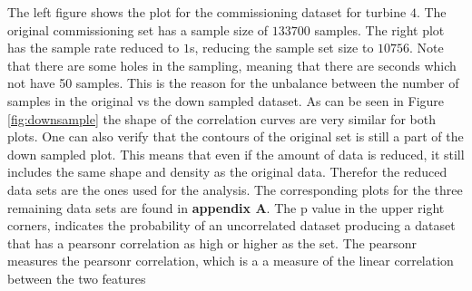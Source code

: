             The left figure shows the plot for the commissioning dataset for turbine $4$. The original commissioning set has a sample size of $133700$ samples. The right plot has the sample rate reduced to $1$s, reducing the sample set size to $10756$. Note that there are some holes in the sampling, meaning that there are seconds which not have 50 samples. This is the reason for the unbalance between the number of samples in the original vs the down sampled dataset. As can be seen in Figure \ref{fig:downsample} the shape of the  correlation curves are very similar for both plots. One can also verify that the contours of the original set is still a part of the down sampled plot. This means that even if the amount of data is reduced, it still includes the same shape and density as the original data. Therefor the reduced data sets are the ones used for the analysis. The corresponding plots for the three remaining data sets are found in \textbf{appendix A}. The p value in the upper right corners, indicates the probability of an uncorrelated dataset producing a dataset that has a pearsonr correlation as high or higher as the set. The pearsonr measures the pearsonr correlation, which is a a measure of the linear correlation between the two features    
        
